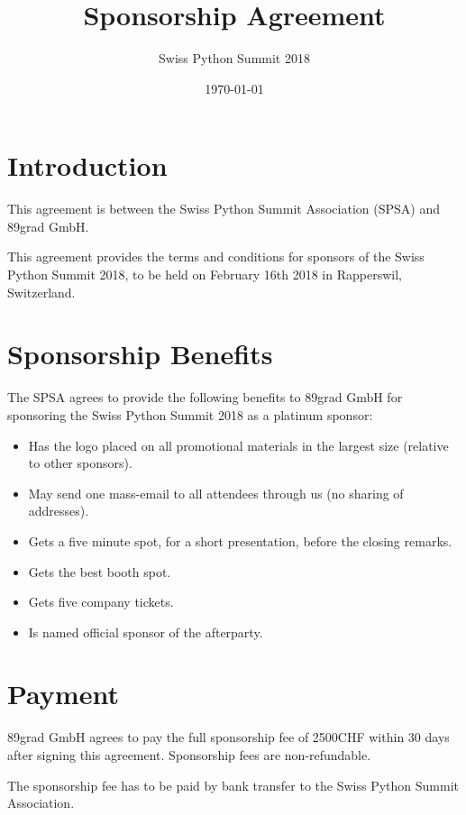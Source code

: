 \documentclass[11pt,enlargefirstpage=true,headlines=4]{scrartcl}
\title{Sponsorship Agreement}
\subtitle{Swiss Python Summit 2018}
\date{\today} %
\begin{document}
    \maketitle

    \section{Introduction}

    This agreement is between the Swiss Python Summit Association (SPSA) and
    89grad GmbH.

    This agreement provides the terms and conditions for sponsors of the Swiss
    Python Summit 2018, to be held on February 16th 2018 in Rapperswil,
    Switzerland.

    \section{Sponsorship Benefits}

    The SPSA agrees to provide the following benefits to 89grad GmbH for sponsoring
    the Swiss Python Summit 2018 as a platinum sponsor:

    \begin{itemize}
        \item Has the logo placed on all promotional materials in the largest size (relative to other sponsors).
        \item May send one mass-email to all attendees through us (no sharing of addresses).
        \item Gets a five minute spot, for a short presentation, before the closing remarks.
        \item Gets the best booth spot.
        \item Gets five company tickets.
        \item Is named official sponsor of the afterparty.
    \end{itemize}

    \section{Payment}

    89grad GmbH agrees to pay the full sponsorship fee of 2500CHF within 30 days
    after signing this agreement. Sponsorship fees are non‐refundable.

    The sponsorship fee has to be paid by bank transfer to the Swiss Python
    Summit Association.

    \quad
\end{document}
